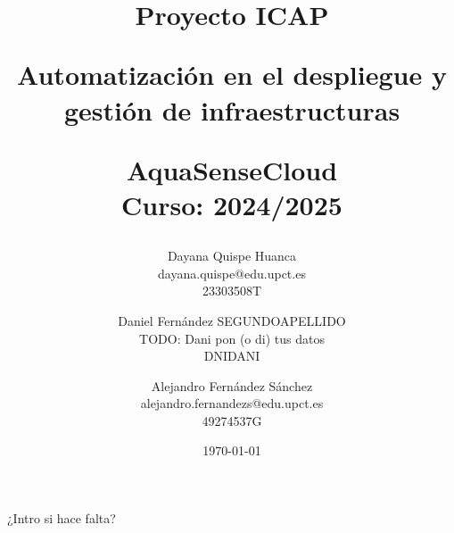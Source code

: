 \documentclass{article}
\title{
    \LARGE Proyecto ICAP \\

    \vspace{5mm}

    Automatización en el despliegue y gestión de infraestructuras \\

    \vspace{5mm}

    \large AquaSenseCloud \\
    \large Curso: 2024/2025
}
\author{
    Dayana Quispe Huanca\\
    dayana.quispe@edu.upct.es\\
    23303508T
    \and
    Daniel Fernández SEGUNDOAPELLIDO\\
    TODO: Dani pon (o di) tus datos\\
    DNIDANI
    \and
    Alejandro Fernández Sánchez\\
    alejandro.fernandezs@edu.upct.es\\
    49274537G
}\date{\today}
\begin{document}
\pagestyle{fancy}
\setlength{\headheight}{75pt}

\maketitle

\vspace{15mm}

\tableofcontents

\vspace{45mm}

¿Intro si hace falta?

\newpage

% 




\end{document}
